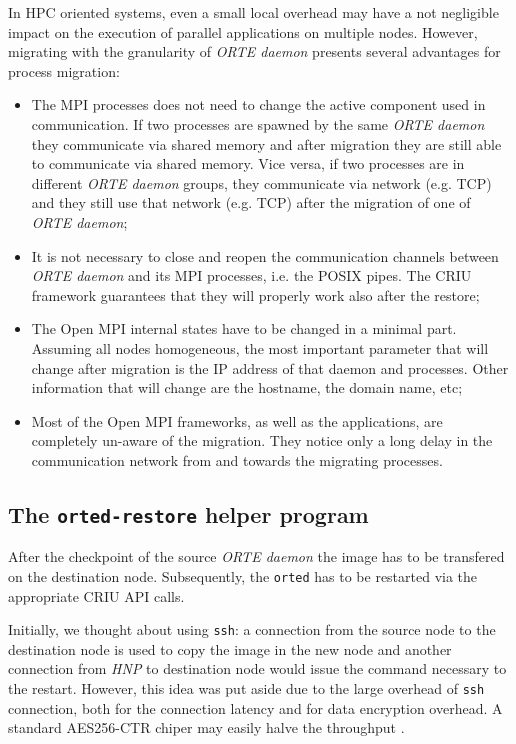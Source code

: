 In HPC oriented systems, even a small local overhead may have a not negligible
impact
on the execution of parallel applications on multiple nodes.
 However, migrating with the granularity of \emph{ORTE daemon} presents
several advantages for process migration:
\begin{itemize}
\item The MPI processes does not need to change the active component used in 
      communication. If two processes are spawned by the same \emph{ORTE daemon}
      they communicate via shared memory and after migration they are still able
      to communicate via shared memory. Vice versa, if two processes are in
      different \emph{ORTE daemon} groups, they communicate via network (e.g. 
      TCP) and they still use that network (e.g. TCP) after the migration of one
      of \emph{ORTE daemon};
\item It is not necessary to close and reopen the communication channels between
      \emph{ORTE daemon} and its MPI processes, i.e. the POSIX pipes. The CRIU
      framework guarantees that they will properly work also after the restore;
\item The Open MPI internal states have to be changed in a minimal part.
      Assuming all nodes homogeneous, the most important parameter that will
      change after migration is the IP address of that daemon and processes.
      Other information that will change are the hostname, the domain name, etc;
\item Most of the Open MPI frameworks, as well as the applications, are
completely
      un-aware of the migration. They notice only a long delay in the
      communication network from and towards the migrating processes.
\end{itemize}

\subsection{The \texttt{orted-restore} helper program}
\label{sub:orted-restore}
After the checkpoint of the source \emph{ORTE daemon} the image has to be
transfered on the destination node. Subsequently, the \texttt{orted} has to be
restarted via the appropriate CRIU API calls. 

Initially, we thought about using \texttt{ssh}: a connection from the source node to
the destination node is used to copy the image in the new node and another
connection from \emph{HNP} to destination node would issue the command necessary
to the restart. However, this idea was put aside due to the large overhead of
\texttt{ssh} connection, both for the connection latency and for data encryption
overhead. A standard AES256-CTR chiper may easily halve the throughput
\cite{rapier2008high}.


